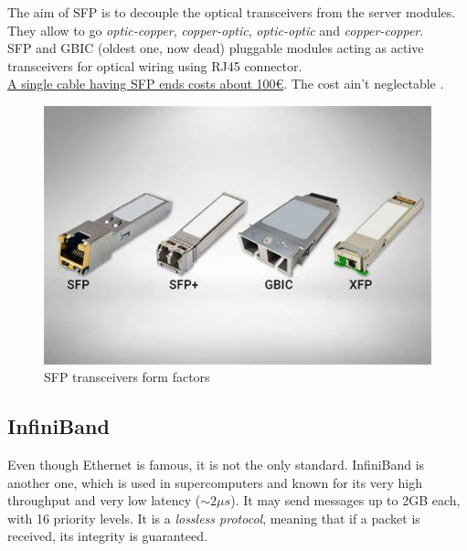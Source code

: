 \begin{paracol}{2}
   
   The aim of SFP is to decouple the optical transceivers from the server modules.
   They allow to go \textit{optic-copper}, \textit{copper-optic}, \textit{optic-optic} and \textit{copper-copper}.\\
   SFP and GBIC (oldest one, now dead) pluggable modules acting as active transceivers for optical wiring using RJ45 connector.\\
   \ul{A single cable having SFP ends costs about 100€}.
   The cost ain't neglectable \smiley.


   \switchcolumn

   \begin{figure}[htbp]
      \centering
      \includegraphics{images/sfp.jpeg}
      \caption{SFP transceivers form factors}
      \label{fig:sfp}
   \end{figure}
\end{paracol}


\subsection{InfiniBand}
Even though Ethernet is famous, it is not the only standard. InfiniBand is another one, which is used in supercomputers and known for its very high throughput and very low latency ($\sim 2\mu s$).
It may send messages up to 2GB each, with 16 priority levels.
It is a \textit{lossless protocol}, meaning that if a packet is received, its integrity is guaranteed.

